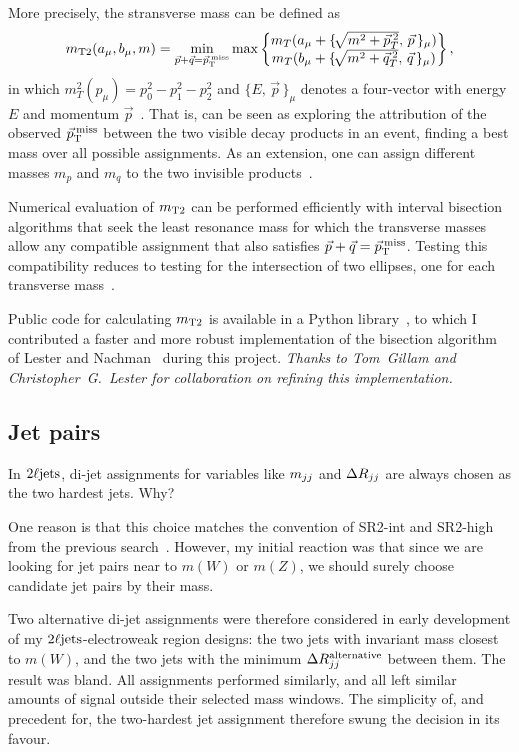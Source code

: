 More precisely, the stransverse mass can be defined as
\begin{equation}
m_\mathrm{T2}(a_\mu, b_\mu, m)
=
\min_{\vec p + \vec q=\vec p_\mathrm{T}^\mathrm{\:miss}}
\max
\begin{Bmatrix}
m_T(a_\mu + \{\!\sqrt{m^2 + \vec p_T^{\:2}},\,\vec p\,\}_\mu)\\
m_T(b_\mu + \{\!\sqrt{m^2 + \vec q_T^{\:2}},\,\vec q\,\}_\mu)\\
\end{Bmatrix}
,
\end{equation}
in which $m_T^2(p_\mu) = p_0^2 - p_1^2 - p_2^2$ and $\{E,\,\vec p\,\}_\mu$
denotes a four-vector with energy $E$ and momentum
$\vec p$~\cite{lester1999measuring}.
That is, can be seen as exploring the attribution of the observed $\vec p_\mathrm{T}^\mathrm{\:miss}$
between the two visible decay products in an event, finding a best mass over
all possible assignments.
As an extension, one can assign different masses $m_p$ and $m_q$ to
the two invisible products~\cite{lester2015bisection}.

Numerical evaluation of $m_\mathrm{T2}$ can be performed efficiently with interval
bisection algorithms that seek the least resonance mass for which the
transverse masses allow any compatible assignment that also satisfies
$\vec p + \vec q = \vec p_\mathrm{T}^\mathrm{\:miss}$.
Testing this compatibility reduces to testing for the intersection of two
ellipses, one for each transverse
mass~\cite{cheng2008minimal, lester2015bisection}.

Public code for calculating $m_\mathrm{T2}$ is available in a Python
library~\cite{gillam2021mt2}, to which I contributed a faster and more robust
implementation of the bisection algorithm of
Lester and Nachman~\cite{lester2015bisection} during this project.
\emph{Thanks to Tom~Gillam and Christopher~G.~Lester for collaboration on
refining this implementation.}


\subsection{Jet pairs}
In $2\ell\mathrm{jets}$, di-jet assignments for variables like $m_{jj}$ and $\Delta R_{jj}$ are
always chosen as the two hardest jets. Why?

One reason is that this choice matches the convention of SR2-int and SR2-high
from the previous search~\cite{atlas_23l_SUSY_2016_24}.
However, my initial reaction was that since we are looking for jet pairs near
to $m(W)$ or $m(Z)$, we should surely choose candidate jet pairs by their mass.

Two alternative di-jet assignments were therefore considered in early
development of my $2\ell\mathrm{jets}$-electroweak region designs:
the two jets with invariant mass closest to $m(W)$, and the two jets with the
minimum $\Delta R_{jj}^\mathrm{alternative}$ between them.
The result was bland.
All assignments performed similarly, and all left similar amounts of signal
outside their selected mass windows.
The simplicity of, and precedent for, the two-hardest jet assignment therefore
swung the decision in its favour.

